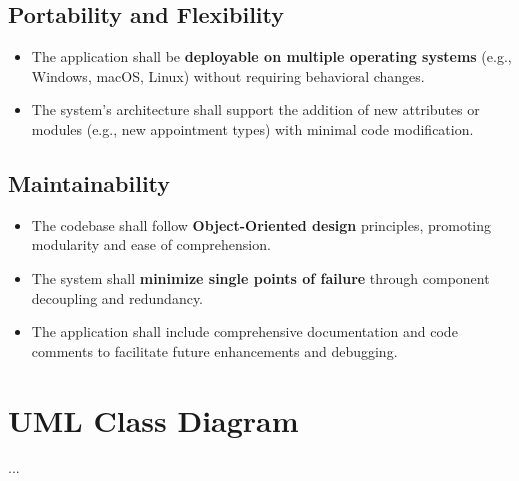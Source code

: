 \subsection{Portability and Flexibility}
\begin{itemize}
	\item The application shall be \textbf{deployable on multiple operating systems} (e.g., Windows, macOS, Linux) without requiring behavioral changes.
	\item The system’s architecture shall support the addition of new attributes or modules (e.g., new appointment types) with minimal code modification.
\end{itemize}

\subsection{Maintainability}
\begin{itemize}
	\item The codebase shall follow \textbf{Object-Oriented design} principles, promoting modularity and ease of comprehension.
	\item The system shall \textbf{minimize single points of failure} through component decoupling and redundancy.
	\item The application shall include comprehensive documentation and code comments to facilitate future enhancements and debugging.
\end{itemize}

\section{UML Class Diagram}
...